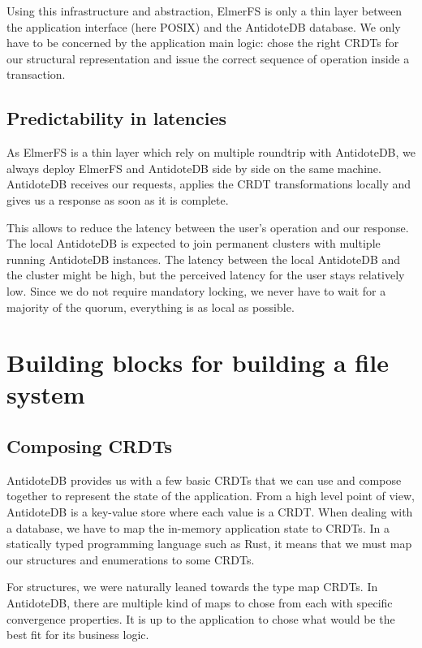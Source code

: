 \documentclass[sigplan, 10pt]{acmart}
\begin{document}
Using this infrastructure and abstraction, ElmerFS is only a thin layer between
the application interface (here POSIX) and the AntidoteDB database. We only
have to be concerned by the application main logic: chose the right
CRDTs for our structural representation and issue the correct
sequence of operation inside a transaction.

\subsection{Predictability in latencies}

As ElmerFS is a thin layer which rely on multiple roundtrip with AntidoteDB,
we always deploy ElmerFS and AntidoteDB side by side on the same machine.
AntidoteDB receives our requests, applies the CRDT transformations
locally and gives us a response as soon as it is complete.

This allows to reduce the latency between the user's operation and our response.
The local AntidoteDB is expected to join permanent clusters with multiple
running AntidoteDB instances. The latency between the local AntidoteDB and
the cluster might be high, but the perceived latency for the user stays
relatively low. Since we do not require mandatory locking, we never have to
wait for a majority of the quorum, everything is as local as possible.

\section{Building blocks for building a file system}

\subsection{Composing CRDTs}

AntidoteDB provides us with a few basic CRDTs that we can use and compose together
to represent the state of the application. From a high level point of view,
AntidoteDB is a key-value store where each value is a CRDT.
When dealing with a database, we have to map
the in-memory application state to CRDTs.
In a statically typed programming language such as Rust, it means
that we must map our structures and enumerations to some CRDTs.

For structures, we were naturally leaned towards the type map CRDTs.
In AntidoteDB, there are multiple kind of maps to chose from each with specific
convergence properties. It is up to the application to chose what would be the best fit
for its business logic.
\end{document}
